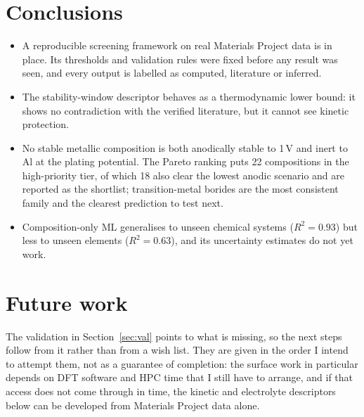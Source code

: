 \documentclass{report}
\begin{document}
\section{Conclusions}
\begin{itemize}[leftmargin=*,itemsep=2pt]
\item A reproducible screening framework on real Materials Project data is in place. Its thresholds and validation rules were fixed before any result was seen, and every output is labelled as computed, literature or inferred.
\item The stability-window descriptor behaves as a thermodynamic lower bound: it shows no contradiction with the verified literature, but it cannot see kinetic protection.
\item No stable metallic composition is both anodically stable to 1\,V and inert to Al at the plating potential. The Pareto ranking puts 22 compositions in the high-priority tier, of which 18 also clear the lowest anodic scenario and are reported as the shortlist; transition-metal borides are the most consistent family and the clearest prediction to test next.
\item Composition-only ML generalises to unseen chemical systems ($R^2 = 0.93$) but less to unseen elements ($R^2 = 0.63$), and its uncertainty estimates do not yet work.
\end{itemize}


\pagebreak
\section{Future work}
\label{sec:plan}

The validation in Section~\ref{sec:val} points to what is missing, so the next steps follow from it rather than from a wish list. They are given in the order I intend to attempt them, not as a guarantee of completion: the surface work in particular depends on DFT software and HPC time that I still have to arrange, and if that access does not come through in time, the kinetic and electrolyte descriptors below can be developed from Materials Project data alone.
\end{document}
